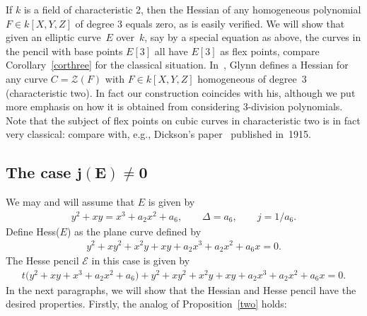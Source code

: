 \documentclass[pdftex]{sigma}
\numberwithin{equation}{section}
\begin{document}
If $k$ is a field of characteristic 2, then the Hessian of any homogeneous polynomial $F\in k[X,Y,Z]$ of degree 3 equals zero, as is easily verified. We will show that given an elliptic curve~$E$ over~$k$, say by a special equation as above, the curves in the pencil with base points $E[3]$ all have $E[3]$ as flex points, compare Corollary~\ref{corthree} for the classical situation. In~\cite{Glynn}, Glynn defines a Hessian for any curve $C=\mathcal{Z}(F)$ with $F \in k[X,Y,Z]$ homogeneous of degree~3 (characteristic two). In fact our construction coincides with his, although we put more emphasis on how it is obtained from considering $3$-division polynomials. Note that the subject of flex points on cubic curves in characteristic two is in fact very classical: compare with, e.g., Dickson's paper~\cite{Dickson} published in~1915.

\subsection[The case $j(E) \neq 0$]{The case $\boldsymbol{j(E) \neq 0}$}\label{8.2}
We may and will assume that $E$ is given by
\begin{gather*}y^2 +xy=x^3+a_2x^2+a_6, \qquad \Delta=a_6, \qquad j=1/a_6.\end{gather*}
Define Hess($E$) as the plane curve defined by
\begin{gather*}y^2+xy^2+x^2y+xy+a_2x^3+a_2x^2+a_6x=0.\end{gather*}
The Hesse pencil $\mathcal{E}$ in this case is given by
\begin{gather*}t\big(y^2 +xy + x^3+a_2x^2+a_6\big) + y^2+xy^2+x^2y+xy+a_2x^3+a_2x^2+a_6x=0.\end{gather*}
In the next paragraphs, we will show that the Hessian and Hesse pencil have the desired pro\-per\-ties. Firstly, the analog of Proposition~\ref{two} holds:
\end{document}
